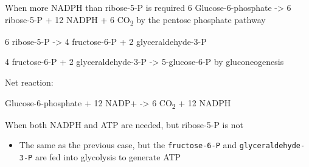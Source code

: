 \documentclass[bigger]{beamer}
\begin{document}
\begin{frame}[label={sec:orge66720f}]{When \alert{more} NADPH than ribose-5-P is required}
6 Glucose-6-phosphate -> 6 ribose-5-P + 12 NADPH + 6 CO\textsubscript{2} by the pentose phosphate pathway 

6 ribose-5-P -> 4 fructose-6-P + 2 glyceraldehyde-3-P

4 fructose-6-P + 2 glyceraldehyde-3-P -> 5-glucose-6-P by gluconeogenesis

Net reaction:

Glucose-6-phosphate + 12 NADP+ -> 6 CO\textsubscript{2} + 12 NADPH
\end{frame}

\begin{frame}[label={sec:org8f4280b},fragile]{When \alert{both} NADPH and ATP are needed, but ribose-5-P is not}
 \begin{itemize}
\item The same as the previous case, but the \texttt{fructose-6-P} and \texttt{glyceraldehyde-3-P}
are fed into glycolysis to generate ATP
\end{itemize}
\end{frame}
\end{document}
